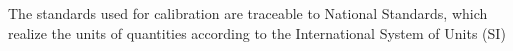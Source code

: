 The standards used for calibration are traceable to National Standards, which realize the units of quantities according to the International System of Units (SI)